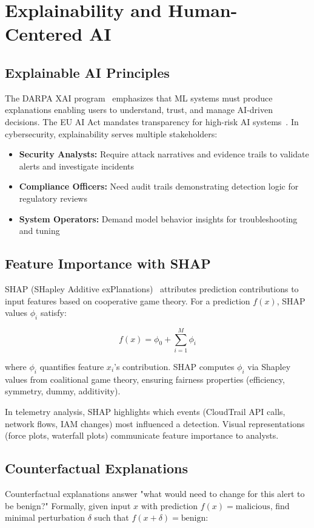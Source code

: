 \section{Explainability and Human-Centered AI}\label{sec:theory-xai}
\subsection{Explainable AI Principles}
The DARPA XAI program~\cite{darpa2020xai} emphasizes that ML systems must produce explanations enabling users to understand, trust, and manage AI-driven decisions. The EU AI Act mandates transparency for high-risk AI systems~\cite{euaiact2023}. In cybersecurity, explainability serves multiple stakeholders:
\begin{itemize}
    \item \textbf{Security Analysts:} Require attack narratives and evidence trails to validate alerts and investigate incidents
    \item \textbf{Compliance Officers:} Need audit trails demonstrating detection logic for regulatory reviews
    \item \textbf{System Operators:} Demand model behavior insights for troubleshooting and tuning
\end{itemize}

\subsection{Feature Importance with SHAP}
SHAP (SHapley Additive exPlanations)~\cite{lundberg2017shap} attributes prediction contributions to input features based on cooperative game theory. For a prediction $f(x)$, SHAP values $\phi_i$ satisfy:

$$f(x) = \phi_0 + \sum_{i=1}^{M} \phi_i$$

where $\phi_i$ quantifies feature $x_i$'s contribution. SHAP computes $\phi_i$ via Shapley values from coalitional game theory, ensuring fairness properties (efficiency, symmetry, dummy, additivity).

In telemetry analysis, SHAP highlights which events (CloudTrail API calls, network flows, IAM changes) most influenced a detection. Visual representations (force plots, waterfall plots) communicate feature importance to analysts.

\subsection{Counterfactual Explanations}
Counterfactual explanations answer "what would need to change for this alert to be benign?" Formally, given input $x$ with prediction $f(x) = \text{malicious}$, find minimal perturbation $\delta$ such that $f(x + \delta) = \text{benign}$:

